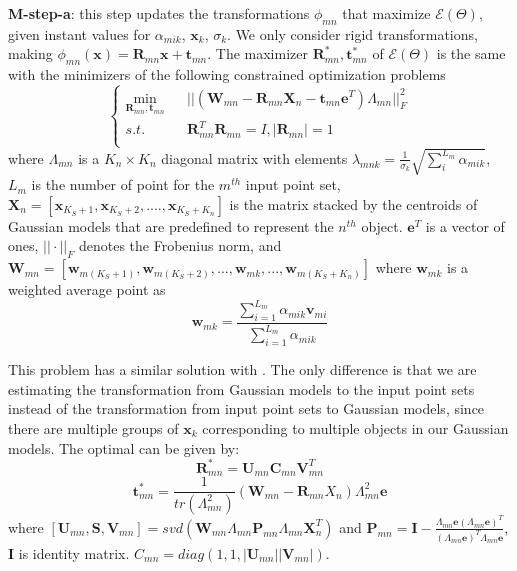 \noindent\textbf{M-step-a}: this step updates the transformations $\phi_{mn}$ that maximize $\mathcal{E}(\Theta)$, given instant values for $\alpha_{mik}$, $\mathbf{x}_k$, $\sigma_k$.
%
We only consider rigid transformations, making  $\phi_{mn}(\mathbf{x})=\mathbf{R}_{mn}\mathbf{x}+\mathbf{t}_{mn}$. The maximizer $\mathbf{R}_{mn}^*,\mathbf{t}_{mn}^*$ of $\mathcal{E}(\Theta)$ is the same with the minimizers of the following constrained optimization problems
%
\begin{equation}
\left\{
\begin{array}{rcl}
\min_{\mathbf{R}_{mn},\mathbf{t}_{mn}}&      &||(\mathbf{W}_{mn}-\mathbf{R}_{mn}\mathbf{X}_n-\mathbf t_{mn}\mathbf{e}^T)\Lambda_{mn}||_F^2\\
s.t.&      &\mathbf{R}_{mn}^T\mathbf{R}_{mn}=I, |\mathbf{R}_{mn}|=1\\
\end{array} \right.
\end{equation}
where $\Lambda_{mn}$ is a $K_n \times K_n$ diagonal matrix with elements $\lambda_{mnk}=\frac{1}{\sigma_k}\sqrt{\sum_i^{L_{m}}\alpha_{mik}}$, $L_m$ is the number of point for the $m^{th}$ input point set, $\mathbf{X}_n = [\mathbf{x}_{K_S+1}, \mathbf{x}_{K_S+2},...., \mathbf{x}_{K_S+K_n}]$ is the matrix stacked by the centroids of Gaussian models that are predefined to represent the $n^{th}$ object. 
$\mathbf{e}^T$ is a vector of ones, $||\cdot||_F$ denotes the Frobenius norm, and $\mathbf{W}_{mn}=[\mathbf{w}_{m(K_S+1)},\mathbf{w}_{m(K_S+2)},...,\mathbf{w}_{mk},...,\mathbf{w}_{m(K_S+K_n)}]$ where $\mathbf{w}_{mk}$ is a weighted average point as
%
\begin{equation}
\mathbf{w}_{mk}=\frac{\sum_{i=1}^{L_m}\alpha_{mik} \mathbf{v}_{mi}}{\sum_{i=1}^{L_m}\alpha_{mik}}
\end{equation}

This problem has a similar solution with \cite{Evangelidis2014}. 
The only difference is that we are estimating the transformation from Gaussian models to the input point sets instead of the transformation from input point sets to Gaussian models, since there are multiple groups of $\mathbf{x}_k$ corresponding to multiple objects in our Gaussian models. The optimal can be given by:
%
\begin{equation}
\label{equ:updateR}
\mathbf{R}_{mn}^*=\mathbf{U}_{mn}\mathbf{C}_{mn}\mathbf{V}_{mn}^T
\end{equation}
%
\begin{equation}
\label{equ:updatet}
\mathbf{t}_{mn}^*=\frac{1}{tr(\Lambda_{mn}^2)}(\mathbf{W}_{mn}-\mathbf{R}_{mn}X_n)\Lambda_{mn}^2\mathbf{e}
\end{equation}
where $[\mathbf{U}_{mn},\mathbf{S},\mathbf{V}_{mn}]=svd( \mathbf{W}_{mn}\Lambda_{mn}\mathbf{P}_{mn}\Lambda_{mn}\mathbf{X}_{n}^T )$ and $\mathbf{P}_{mn}=\mathbf{I}-\frac{\Lambda_{mn}\mathbf{e}(\Lambda_{mn}\mathbf{e})^T}{(\Lambda_{mn}\mathbf{e})^T\Lambda_{mn}\mathbf{e}}$, $\mathbf{I}$ is identity matrix. $C_{mn}=diag(1,1,|\mathbf{U}_{mn}||\mathbf{V}_{mn}|)$.

